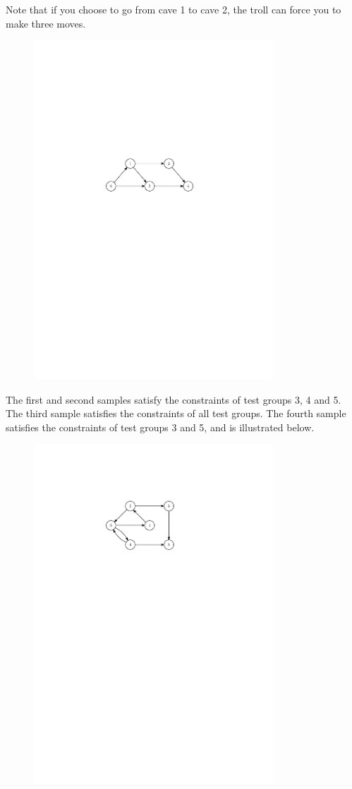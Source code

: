 Note that if you choose to go from cave 1 to cave 2, the troll can force you to make three moves.

\begin{figure}
\centering
\includegraphics[width=0.8\textwidth]{sample-1}
\end{figure}

The first and second samples satisfy the constraints of test groups 3, 4 and 5.
The third sample satisfies the constraints of all test groups.
The fourth sample satisfies the constraints of test groups 3 and 5, and is illustrated below.

\begin{figure}
\centering
\includegraphics[width=0.8\textwidth]{sample-2}
\end{figure}

